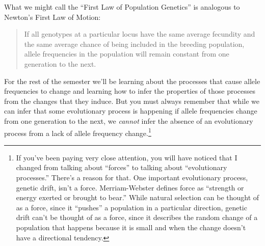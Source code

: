 \documentclass[12pt]{article}
\begin{document}
What we might call the ``First Law of Population Genetics'' is
analogous to Newton's First Law of Motion:
\begin{quotation}
\noindent If all genotypes at a particular locus have the same average
fecundity and the same average chance of being included in the breeding
population, allele frequencies in the population will remain constant
from one generation to the next.
\end{quotation}
For the rest of the semester we'll be learning about the processes
that cause allele frequencies to change and learning how to infer the
properties of those processes from the changes that they induce. But
you must always remember that while we can infer that some
evolutionary process is happening if allele frequencies change from
one generation to the next, we {\it cannot\/} infer the absence of an
evolutionary process from a lack of allele frequency
change.\footnote{If you've been paying very close attention, you will
  have noticed that I changed from talking about ``forces'' to talking
about ``evolutionary processes.'' There's a reason for that. One
important evolutionary process, genetic drift, isn't a
force. Merriam-Webster defines force as ``strength or energy exerted
or brought to bear.'' While natural selection can be thought of as a
force, since it ``pushes'' a population in a particular direction,
genetic drift can't be thought of as a force, since it describes the
random change of a population that happens because it is small and
when the change doesn't have a directional tendency.}




\ccLicense
\end{document}
